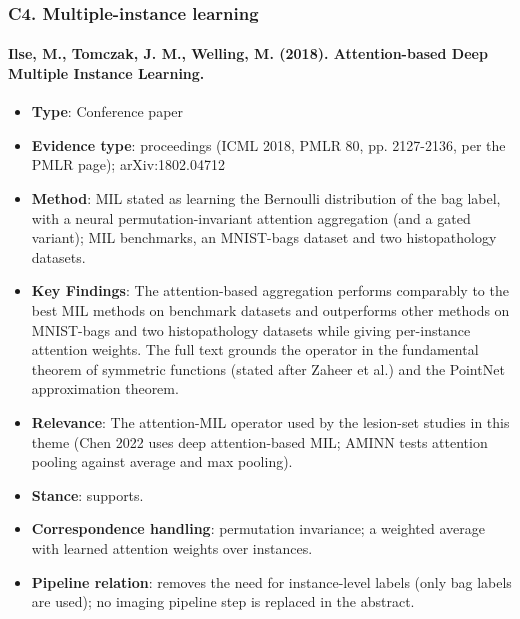 \documentclass[journal,onecolumn]{IEEEtran}
\begin{document}
\subsubsection{C4. Multiple-instance learning}

\paragraph{Ilse, M., Tomczak, J. M., Welling, M. (2018). Attention-based Deep Multiple Instance Learning.~\cite{Ilse2018AttentionMIL}}\mbox{}

\begin{itemize}

\item{} \textbf{Type}: Conference paper

\item{} \textbf{Evidence type}: proceedings (ICML 2018, PMLR 80, pp. 2127-2136, per the PMLR page); arXiv:1802.04712

\item{} \textbf{Method}: MIL stated as learning the Bernoulli distribution of the bag label, with a neural permutation-invariant attention aggregation (and a gated variant); MIL benchmarks, an MNIST-bags dataset and two histopathology datasets.

\item{} \textbf{Key Findings}: The attention-based aggregation performs comparably to the best MIL methods on benchmark datasets and outperforms other methods on MNIST-bags and two histopathology datasets while giving per-instance attention weights. The full text grounds the operator in the fundamental theorem of symmetric functions (stated after Zaheer et al.) and the PointNet approximation theorem.

\item{} \textbf{Relevance}: The attention-MIL operator used by the lesion-set studies in this theme (Chen 2022 uses deep attention-based MIL; AMINN tests attention pooling against average and max pooling).

\item{} \textbf{Stance}: supports.

\item{} \textbf{Correspondence handling}: permutation invariance; a weighted average with learned attention weights over instances.

\item{} \textbf{Pipeline relation}: removes the need for instance-level labels (only bag labels are used); no imaging pipeline step is replaced in the abstract.


\end{itemize}
\end{document}
